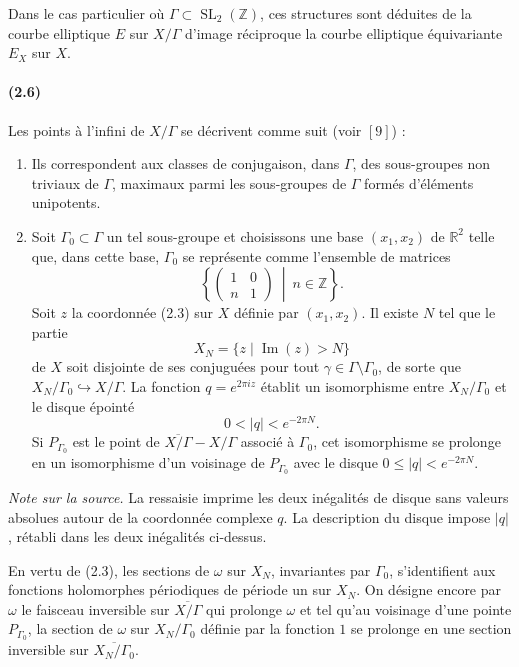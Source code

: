 \documentclass[10pt]{article}
\newcommand{\R}{\mathbb R}
\newcommand{\Z}{\mathbb Z}
\newcommand{\SL}{\operatorname{SL}}
\begin{document}
Dans le cas particulier où $\Gamma\subset\SL_2(\Z)$, ces structures sont déduites de la
courbe elliptique $E$ sur $X/\Gamma$ d'image réciproque la courbe elliptique équivariante
$E_X$ sur $X$.

\paragraph{(2.6)}
Les points à l'infini de $X/\Gamma$ se décrivent comme suit (voir \([9]\)) :

\begin{enumerate}[label=(\alph*)]
\item Ils correspondent aux classes de conjugaison, dans $\Gamma$, des sous-groupes non
triviaux de $\Gamma$, maximaux parmi les sous-groupes de $\Gamma$ formés d'éléments
unipotents.

\item Soit $\Gamma_0\subset \Gamma$ un tel sous-groupe et choisissons une base
$(x_1,x_2)$ de $\R^2$ telle que, dans cette base, $\Gamma_0$ se représente comme l'ensemble
de matrices
\[
\left\{\begin{pmatrix}1&0\\ n&1\end{pmatrix}\ \middle|\ n\in\Z\right\}.
\]
Soit $z$ la coordonnée (2.3) sur $X$ définie par $(x_1,x_2)$. Il existe $N$ tel que le
partie
\[
X_N=\{z\mid \operatorname{Im}(z)>N\}
\]
de $X$ soit disjointe de ses conjuguées pour tout $\gamma\in\Gamma\setminus\Gamma_0$,
de sorte que $X_N/\Gamma_0\hookrightarrow X/\Gamma$. La fonction $q=e^{2\pi iz}$
établit un isomorphisme entre $X_N/\Gamma_0$ et le disque épointé
\[
0<|q|<e^{-2\pi N}.
\]
Si $P_{\Gamma_0}$ est le point de $\overline{X/\Gamma}-X/\Gamma$ associé à $\Gamma_0$,
cet isomorphisme se prolonge en un isomorphisme d'un voisinage de $P_{\Gamma_0}$ avec
le disque $0\le |q|<e^{-2\pi N}$.
\end{enumerate}

\noindent\emph{Note sur la source.} La ressaisie imprime les deux inégalités de disque
sans valeurs absolues autour de la coordonnée complexe $q$. La description du disque
impose $|q|$, rétabli dans les deux inégalités ci-dessus.

En vertu de (2.3), les sections de $\omega$ sur $X_N$, invariantes par $\Gamma_0$, s'identifient
aux fonctions holomorphes périodiques de période un sur $X_N$. On désigne encore par
$\omega$ le faisceau inversible sur $\overline{X/\Gamma}$ qui prolonge $\omega$ et tel qu'au
voisinage d'une pointe $P_{\Gamma_0}$, la section de $\omega$ sur $X_N/\Gamma_0$ définie par
la fonction $1$ se prolonge en une section inversible sur $\overline{X_N/\Gamma_0}$.
\end{document}
